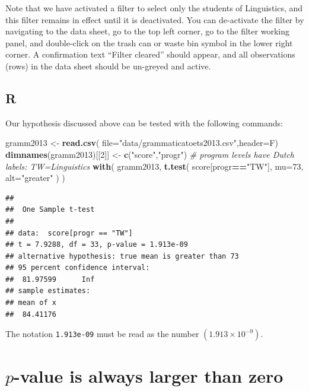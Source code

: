 \documentclass[
]{book}
\newenvironment{Shaded}{\begin{snugshade}}{\end{snugshade}}
\newcommand{\AttributeTok}[1]{\textcolor[rgb]{0.13,0.29,0.53}{#1}}
\newcommand{\CommentTok}[1]{\textcolor[rgb]{0.56,0.35,0.01}{\textit{#1}}}
\newcommand{\DecValTok}[1]{\textcolor[rgb]{0.00,0.00,0.81}{#1}}
\newcommand{\FunctionTok}[1]{\textcolor[rgb]{0.13,0.29,0.53}{\textbf{#1}}}
\newcommand{\NormalTok}[1]{#1}
\newcommand{\OtherTok}[1]{\textcolor[rgb]{0.56,0.35,0.01}{#1}}
\newcommand{\SpecialCharTok}[1]{\textcolor[rgb]{0.81,0.36,0.00}{\textbf{#1}}}
\newcommand{\StringTok}[1]{\textcolor[rgb]{0.31,0.60,0.02}{#1}}
\begin{document}
Note that we have activated a filter to select only the students of Linguistics, and this filter remains in effect until it is deactivated. You can de-activate the filter by navigating to the data sheet, go to the top left corner, go to the filter working panel, and double-click on the trash can or waste bin symbol in the lower right corner. A confirmation text ``Filter cleared'' should appear, and all observations (rows) in the data sheet should be un-greyed and active.

\hypertarget{r-12}{%
\subsection{R}\label{r-12}}

Our hypothesis discussed above can be tested with the following commands:

\begin{Shaded}
\begin{Highlighting}[]
\NormalTok{gramm2013 }\OtherTok{\textless{}{-}} \FunctionTok{read.csv}\NormalTok{( }\AttributeTok{file=}\StringTok{"data/grammaticatoets2013.csv"}\NormalTok{,}\AttributeTok{header=}\NormalTok{F)}
\FunctionTok{dimnames}\NormalTok{(gramm2013)[[}\DecValTok{2}\NormalTok{]] }\OtherTok{\textless{}{-}} \FunctionTok{c}\NormalTok{(}\StringTok{"score"}\NormalTok{,}\StringTok{"progr"}\NormalTok{)}
\CommentTok{\# program levels have Dutch labels: TW=Linguistics}
\FunctionTok{with}\NormalTok{( gramm2013,}
      \FunctionTok{t.test}\NormalTok{( score[progr}\SpecialCharTok{==}\StringTok{"TW"}\NormalTok{], }\AttributeTok{mu=}\DecValTok{73}\NormalTok{, }\AttributeTok{alt=}\StringTok{"greater"}\NormalTok{ ) )}
\end{Highlighting}
\end{Shaded}

\begin{verbatim}
## 
##  One Sample t-test
## 
## data:  score[progr == "TW"]
## t = 7.9288, df = 33, p-value = 1.913e-09
## alternative hypothesis: true mean is greater than 73
## 95 percent confidence interval:
##  81.97599      Inf
## sample estimates:
## mean of x 
##  84.41176
\end{verbatim}

The notation \texttt{1.913e-09} must be read as the number
\((1.913 \times 10^{-9})\).

\hypertarget{sec:plargerthannull}{%
\section{\texorpdfstring{\(p\)-value is always larger than zero}{p-value is always larger than zero}}\label{sec:plargerthannull}}
\end{document}
